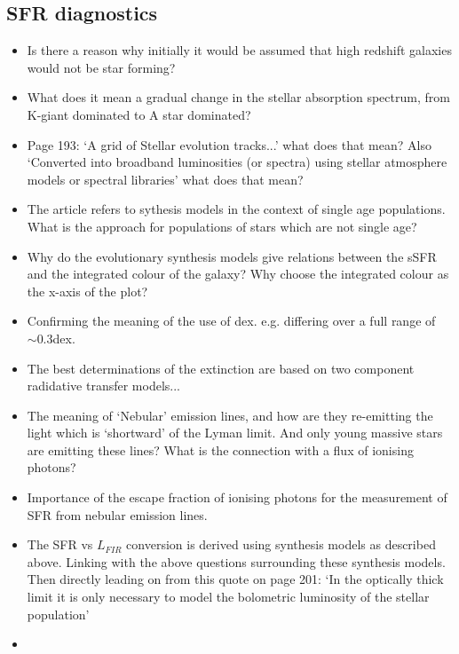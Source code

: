 \documentclass{literature}
\begin{document}
\subsection{SFR diagnostics}
\begin{itemize}
\item Is there a reason why initially it would be assumed that high redshift galaxies would not be star forming? 
\item What does it mean a gradual change in the stellar absorption spectrum, from K-giant dominated to A star dominated? 
\item Page 193: `A grid of Stellar evolution tracks...' what does that mean? Also `Converted into broadband luminosities (or spectra) using stellar atmosphere models or spectral libraries' what does that mean? 
\item The article refers to sythesis models in the context of single age populations. What is the approach for populations of stars which are not single age? 
\item Why do the evolutionary synthesis models give relations between the sSFR and the integrated colour of the galaxy? Why choose the integrated colour as the x-axis of the plot? 
\item Confirming the meaning of the use of dex. e.g. differing over a full range of $\sim 0.3$dex.
\item The best determinations of the extinction are based on two component radidative transfer models...
\item The meaning of `Nebular' emission lines, and how are they re-emitting the light which is `shortward' of the Lyman limit. And only young massive stars are emitting these lines? What is the connection with a flux of ionising photons? 
\item Importance of the escape fraction of ionising photons for the measurement of SFR from nebular emission lines.
\item The SFR vs $L_{FIR}$ conversion is derived using synthesis models as described above. Linking with the above questions surrounding these synthesis models. Then directly leading on from this quote on page 201: `In the optically thick limit it is only necessary to model the bolometric luminosity of the stellar population'
\item

\end{itemize}



\end{document}
